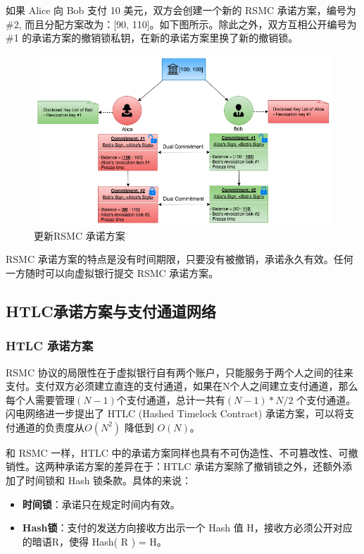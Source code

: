 如果 Alice 向 Bob 支付 10 美元，双方会创建一个新的 RSMC 承诺方案，编号为 \#2, 而且分配方案改为：[90, 110]。如下图所示。除此之外，双方互相公开编号为 \#1 的承诺方案的撤销锁私钥，在新的承诺方案里换了新的撤销锁。

\begin{figure}[h!]
    \centering
    \includegraphics[width=16cm, keepaspectratio]{../images/rsmc_2.png}
    \caption{更新RSMC 承诺方案}
    \label{fig:rsmc_2}
\end{figure}

RSMC 承诺方案的特点是没有时间期限，只要没有被撤销，承诺永久有效。任何一方随时可以向虚拟银行提交 RSMC 承诺方案。

\subsection{HTLC承诺方案与支付通道网络}

\subsubsection{HTLC 承诺方案}
RSMC 协议的局限性在于虚拟银行自有两个账户，只能服务于两个人之间的往来支付。支付双方必须建立直连的支付通道，如果在N个人之间建立支付通道，那么每个人需要管理$(N-1)$个支付通道，总计一共有$(N - 1)*N/2$ 个支付通道。闪电网络进一步提出了 HTLC (Hashed Timelock Contract) 承诺方案，可以将支付通道的负责度从$O(N^2)$ 降低到 $O(N)$。

和 RSMC 一样，HTLC 中的承诺方案同样也具有不可伪造性、不可篡改性、可撤销性。这两种承诺方案的差异在于：HTLC 承诺方案除了撤销锁之外，还额外添加了时间锁和 Hash 锁条款。具体的来说：

\begin{itemize}
    \item \textbf{时间锁}：承诺只在规定时间内有效。
    \item \textbf{Hash锁}：支付的发送方向接收方出示一个 Hash 值 H，接收方必须公开对应的暗语R，使得 Hash( R ) = H。
\end{itemize}

